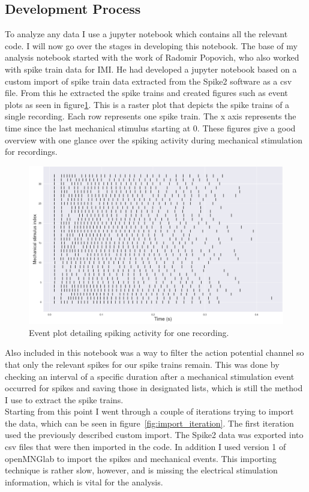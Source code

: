 \subsection{Development Process}
To analyze any data I use a jupyter notebook which contains all the relevant code. I will now go over the stages in developing this notebook.
The base of my analysis notebook started with the work of Radomir Popovich, who also worked with spike train data for IMI. He had developed a jupyter notebook based on a custom import of spike train data extracted from the Spike2 software as a csv file. From this he extracted the spike trains and created figures such as event plots as seen in figure\ref{fig:eventplot}. This is a raster plot that depicts the spike trains of a single recording. Each row represents one spike train. The x axis represents the time since the last mechanical stimulus starting at 0. These figures give a good overview with one glance over the spiking activity during mechanical stimulation for recordings.
\begin{figure}
	\includegraphics[width = \textwidth]{src/pic/event_plot}
	\caption{Event plot detailing spiking activity for one recording.}
	\label{fig:eventplot}
\end{figure}
Also included in this notebook was a way to filter the action potential channel so that only the relevant spikes for our spike trains remain. This was done by checking an interval of a specific duration after a mechanical stimulation event occurred for spikes and saving those in designated lists, which is still the method I use to extract the spike trains.\\
Starting from this point I went through a couple of iterations trying to import the data, which can be seen in figure~\ref{fig:import_iteration}. The first iteration used the previously described custom import. The Spike2 data was exported into csv files that were then imported in the code. In addition I used version 1 of openMNGlab to import the spikes and mechanical events. This importing technique is rather slow, however, and is missing the electrical stimulation information, which is vital for the analysis.\\
